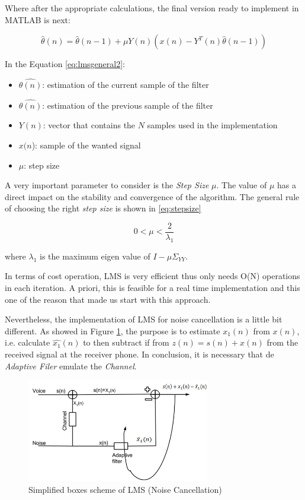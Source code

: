 \documentclass[11pt,a4paper,spanish]{book}  %
\theoremstyle{definition}  %
\theoremstyle{plain}  %
\theoremstyle{remark}  %
\begin{document}
	Where after the appropriate calculations, the final version ready to implement in MATLAB is next:
	
	\begin{equation}
	\label{eq:lmsgeneral2}
		\hat{\theta}(n) = \hat{\theta}(n-1) + \mu Y(n)(x(n)-Y^{T}(n)\hat{\theta}(n-1))
	\end{equation}
	
	In the Equation \ref{eq:lmsgeneral2}:
	
	\begin{itemize}
	\item $\hat{\theta(n)}$: estimation of the current sample of the filter
	\item $\hat{\theta(n)}$: estimation of the previous sample of the filter
	\item $Y(n)$: vector that contains the $N$ samples used in the implementation
	\item $x(n$): sample of the wanted signal
	\item $\mu$: step size
	\end{itemize}
	
	A very important parameter to consider is the \textit{Step Size} $\mu$. The value of $\mu$ has a direct impact on the stability and convergence of the algorithm. The general rule of choosing the right \textit{step size} is shown in \ref{eq:stepsize}
	
	\begin{equation}
	\label{lmsmu}
	0 < \mu <\frac{2}{\lambda_{1}} 
	\end{equation}
	
	where $\lambda_{1}$ is the maximum eigen value of $I-\mu \Sigma_{YY}$.
	
	In terms of cost operation, LMS is very efficient thus only needs O(N) operations in each iteration. A priori, this is feasible for a real time implementation and this one of the reason that made us start with this approach.
	
	Nevertheless, the implementation of LMS for noise cancellation is a little bit different. As showed in Figure \ref{fig:simplms}, the purpose is to estimate $x_{1}(n)$ from $x(n)$, i.e. calculate $\hat{x_{1}}(n)$ to then subtract if from $z(n)=s(n)+x(n)$ from the received signal at the receiver phone. In conclusion, it is necessary that de \textit{Adaptive Filer} emulate the \textit{Channel}.
	
		\begin{figure}[h]
		\centering
		\includegraphics[width=8cm]{images/theory/SimplifiedLMS.jpg}
		\caption{Simplified boxes scheme of LMS (Noise Cancellation)}
		\label{fig:simplms}
		\end{figure}
		
\end{document}
